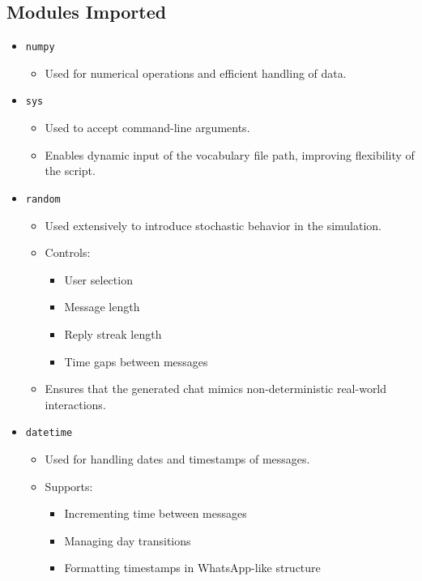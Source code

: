 \documentclass[11pt,a4paper]{article}
\begin{document}
\subsection{Modules Imported}
\begin{itemize}
    \item \texttt{numpy}\cite{numpy}
    \begin{itemize}
        \item Used for numerical operations and efficient handling of data.
    \end{itemize}
    
    \item \texttt{sys}
    \begin{itemize}
        \item Used to accept command-line arguments.
        \item Enables dynamic input of the vocabulary file path, improving flexibility of the script.
    \end{itemize}
    
    \item \texttt{random}
    \begin{itemize}
        \item Used extensively to introduce stochastic behavior in the simulation.
        \item Controls:
        \begin{itemize}
            \item User selection
            \item Message length
            \item Reply streak length
            \item Time gaps between messages
        \end{itemize}
        \item Ensures that the generated chat mimics non-deterministic real-world interactions.
    \end{itemize}
    
    \item \texttt{datetime}
    \begin{itemize}
        \item Used for handling dates and timestamps of messages.
        \item Supports:
        \begin{itemize}
            \item Incrementing time between messages
            \item Managing day transitions
            \item Formatting timestamps in WhatsApp-like structure
        \end{itemize}
    \end{itemize}
    

\end{itemize}
\end{document}
